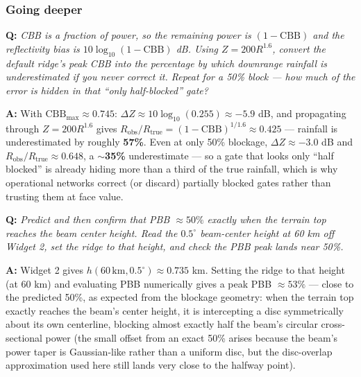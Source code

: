 \documentclass[11pt]{article}
\newenvironment{qa}[1]{\par\noindent\textbf{\color{qgray}Q: }\emph{#1}\par\noindent\textbf{A: }}{\par\vspace{6pt}}
\newcommand{\tier}[1]{\subsubsection*{#1}}
\begin{document}
\tier{Going deeper}
\begin{qa}{CBB is a fraction of power, so the remaining power is $(1-\mathrm{CBB})$ and the reflectivity bias is $10\log_{10}(1-\mathrm{CBB})$ dB. Using $Z=200R^{1.6}$, convert the default ridge's peak CBB into the percentage by which downrange rainfall is underestimated if you never correct it. Repeat for a 50\% block --- how much of the error is hidden in that ``only half-blocked'' gate?}
With $\mathrm{CBB}_{\max}\approx0.745$: $\Delta Z \approx 10\log_{10}(0.255)\approx-5.9$ dB, and propagating through $Z=200R^{1.6}$ gives $R_{\mathrm{obs}}/R_{\mathrm{true}} = (1-\mathrm{CBB})^{1/1.6}\approx0.425$ --- rainfall is underestimated by roughly \textbf{57\%}. Even at only 50\% blockage, $\Delta Z\approx-3.0$ dB and $R_{\mathrm{obs}}/R_{\mathrm{true}}\approx0.648$, a $\sim$\textbf{35\%} underestimate --- so a gate that looks only ``half blocked'' is already hiding more than a third of the true rainfall, which is why operational networks correct (or discard) partially blocked gates rather than trusting them at face value.
\end{qa}
\begin{qa}{Predict and then confirm that PBB $\approx50\%$ exactly when the terrain top reaches the beam center height. Read the $0.5^\circ$ beam-center height at 60 km off Widget 2, set the ridge to that height, and check the PBB peak lands near 50\%.}
Widget 2 gives $h(60\,\mathrm{km},0.5^\circ)\approx0.735$ km. Setting the ridge to that height (at 60 km) and evaluating PBB numerically gives a peak PBB $\approx53\%$ --- close to the predicted 50\%, as expected from the blockage geometry: when the terrain top exactly reaches the beam's center height, it is intercepting a disc symmetrically about its own centerline, blocking almost exactly half the beam's circular cross-sectional power (the small offset from an exact 50\% arises because the beam's power taper is Gaussian-like rather than a uniform disc, but the disc-overlap approximation used here still lands very close to the halfway point).
\end{qa}
\end{document}
